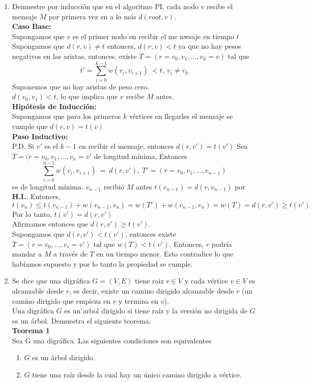 \documentclass[12pt,a4paper]{report}
\begin{document}
\begin{enumerate}
		\item{
			Demuestre por inducción que en el algoritmo PI, cada nodo $v$ recibe el
			mensaje $M$ por primera vez en a lo más $d(root, v)$.\\

			\textbf{Caso Base: }\\
			Supongamos que $v$ es el primer nodo en recibir el me nwsaje en tiempo $t$
			Supongamos que $d(r,v)\neq t$ entonces, $d(r,v) < t$ ya que no hay pesos
			negativos en las aristas, entonces, existe $T=(r=v_0,v_1,...,v_k=v)$ tal que
			\[t'= \sum_{i=0}^{k-1} w(v_i,v_{i+1})\  <t,\ v_i\neq v_k\]
			Suponemos que no hay aristas de peso cero.\\
			$d(v_0,v_1)<t$, lo que implica que $v$ recibe $M$ antes.\\
			\textbf{Hipótesis de Inducción:}\\
			Supongamos que para los primeros $k$ vértices en llegarles el mensaje
			se cumple que $d(r,v)=t(v)$\\
			\textbf{Paso Inductivo: }\\
			P.D. Si $v'$ es el $k-1$ en recibir el mensaje, entonces $d(r,v') = t(v')$
			Sea $T=(r=v_0,v_1,...,v_n=v'$ de longitud mínima, Entonces
			\[\sum_{i=0}^{n-1}w(v_i,v_{i+1})\ =\ d(r,v'),\ T'= (r=v_0,v_1,...,v_{n-1})\]
			es de longitud mínima.
			$v_{n-1}$ recibió $M$ antes $t(v_{n-1})=d(r,v_{n-1})$ por \textbf{H.I.}.
			Entonces,
			\[t(v_n) \leq t(v_{n-1})+w(v_{n-1},v_n)=w(T')+w(v_{n-1},v_n)=w(T)=d(r,v')
				\geq t(v')\]
			Por lo tanto, $t(v')=d(r,v')$\\
			Afirmamos entonces que $d(r,v')\geq t(v')$.\\
			Supongamos que $d(r,v')<t(v')$, entonces existe $T=(r=v_0,...,v_s=v')$
			tal que $w(T)<t(v')$. Entonces, $r$ podría mandar a $M$ a través de $T$
			en un tiempo menor. Esto contradice lo que habíamos supuesto y por lo tanto
			la propiedad se cumple.
		}
		\item{
			Se dice que una digráfica $G = (V, E)$ tiene raiz $r \in V$ y cada
			vértice $v \in V$ es alcanzable desde $r$, es decir, existe un camino
			dirigido alcanzable desde $r$ (un camino dirigido que empieza en $r$ y
			termina en $v$).\\
			Una digráfica $G$ es un  ́arbol dirigido si tiene raíz y la versión no dirigida
			de $G$ es un árbol. Demuestra el siguiente teorema:\\

			\textbf{Teorema 1}\\
			Sea G una digráfica. Las siguientes condiciones son equivalentes
			\begin{enumerate} [label = \alph*)]
				\item {
					$G$ es un árbol dirigido.\\
				}
				\item {
					$G$ tiene una raíz desde la cual hay un único camino dirigido a
					vértice.\\
				}


\end{enumerate}}
\end{enumerate}
\end{document}
